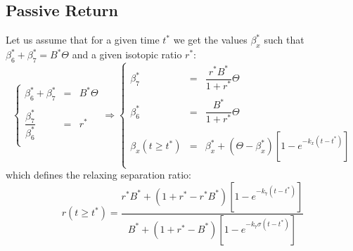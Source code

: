 \documentclass[aps,onecolumn,11pt]{revtex4}
\newcommand{\start}{\ast}
\begin{document}
\subsection{Passive Return}
Let us assume that for a given time $t^\start$ we get the values $\beta_x^\start$ such that $\beta_6^\start+\beta_7^\start=B^\start\Theta$ and a given isotopic ratio $r^\start$:
\begin{equation}
\label{eq:start}
\left\lbrace
\begin{array}{rcl}
\beta_6^\start+\beta_7^\start & = & B^\start\Theta \\
\\
\dfrac{\beta_7^\start}{\beta_6^\start} & = & r^\start\\
\end{array}
\right.
\Rightarrow
\left\lbrace
\begin{array}{rcl}
\beta_7^\start & = & \dfrac{r^\start B^\start}{1+r^\start}\Theta\\
\\
\beta_6^\start & = & \dfrac{B^\start}{1+r^\start}\Theta\\
\\
\beta_x(t\geq t^\start) & = & \beta_x^\start + \left(\Theta-\beta_x^\start\right)\left[1-e^{-k_x(t-t^\start)}\right]\\
\end{array}
\right.
\end{equation}
which defines the relaxing separation ratio:
\begin{equation}
	r(t\geq t^\start) = \dfrac
	{
		r^\start B^\start + ( 1+r^\start - r^\start B^\start) \left[1-e^{-k_7(t-t^\start)}\right]
	}
	{
		 B^\start + ( 1+r^\start -  B^\start) \left[1-e^{-k_7\sigma(t-t^\start)}\right]
	}
\end{equation}
\end{document}
